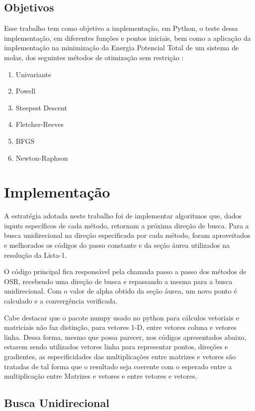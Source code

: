 \documentclass[10pt, a4paper]{article}
\begin{document}
\subsection{Objetivos}

Esse trabalho tem como objetivo a implementação, em Python, o teste dessa implementação, em diferentes funções 
e pontos iniciais, bem como a aplicação da implementação na minimização da Energia Potencial Total de um sistema de molas,
dos seguintes métodos de otimização sem restrição :
\renewcommand{\theenumi}{\alph{enumi}}
\begin{enumerate}
  \item Univariante
  \item Powell
  \item Steepest Descent
  \item Fletcher-Reeves
  \item BFGS
  \item Newton-Raphson
\end{enumerate}

\section{Implementação}

A estratégia adotada neste trabalho foi de implementar algoritmos que, dados inputs específicos de cada método, retornam a próxima direção de busca. Para a busca unidirecional na direção especificada por cada método, 
foram aproveitados e melhorados os códigos do passo constante e da seção áurea utilizados na resolução da Lista-1. 

O código principal fica responsável pela chamada passo a passo dos métodos de OSR,
recebendo uma direção de busca e repassando a mesma para a busca unidirecional.
Com o valor de alpha obtido da seção áurea, um novo ponto é calculado e a convergência verificada.

Cabe destacar que o pacote numpy usado no python para cálculos vetoriais e matriciais não faz distinção,
para vetores 1-D, entre vetores coluna e vetores linha. Dessa forma, mesmo que possa parecer, nos códigos apresentados abaixo,
estarem sendo utilizados vetores linha para representar pontos, direções e gradientes, as especificidades das multiplicações
entre matrizes e vetores são tratadas de tal forma que o resultado seja coerente com o esperado entre a multiplicação
entre Matrizes e vetores e entre vetores e vetores.

\subsection{Busca Unidirecional}
\end{document}
